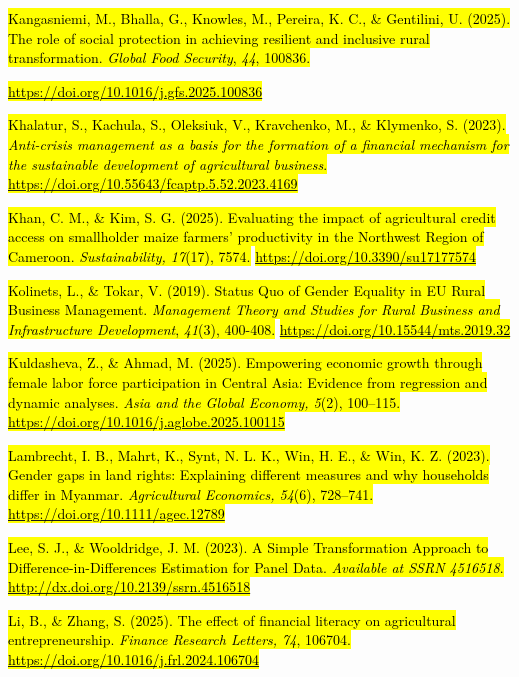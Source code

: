 \documentclass[
]{article}
\begin{document}
\hl{Kangasniemi, M., Bhalla, G., Knowles, M., Pereira, K. C., \&
Gentilini, U. (2025). The role of social protection in achieving
resilient and inclusive rural transformation. \emph{Global Food
Security}, \emph{44}, 100836.}

\href{https://doi.org/10.1016/j.gfs.2025.100836}{\hl{https://doi.org/10.1016/j.gfs.2025.100836}}

\hl{Khalatur, S., Kachula, S., Oleksiuk, V., Kravchenko, M., \&
Klymenko, S. (2023). \emph{Anti-crisis management as a basis for the
formation of a financial mechanism for the sustainable development of
agricultural business}.}
\href{https://doi.org/10.55643/fcaptp.5.52.2023.4169}{\hl{https://doi.org/10.55643/fcaptp.5.52.2023.4169}}

\hl{Khan, C. M., \& Kim, S. G. (2025). Evaluating the impact of
agricultural credit access on smallholder maize farmers' productivity in
the Northwest Region of Cameroon. \emph{Sustainability, 17}(17), 7574.}
\href{https://doi.org/10.3390/su17177574}{\hl{https://doi.org/10.3390/su17177574}}

\hl{Kolinets, L., \& Tokar, V. (2019). Status Quo of Gender Equality in
EU Rural Business Management. \emph{Management Theory and Studies for
Rural Business and Infrastructure Development}, \emph{41}(3), 400-408.}
\href{https://doi.org/10.15544/mts.2019.32}{\hl{https://doi.org/10.15544/mts.2019.32}}

\hl{Kuldasheva, Z., \& Ahmad, M. (2025). Empowering economic growth
through female labor force participation in Central Asia: Evidence from
regression and dynamic analyses. \emph{Asia and the Global Economy,
5}(2), 100--115.}
\href{https://doi.org/10.1016/j.aglobe.2025.100115}{\hl{https://doi.org/10.1016/j.aglobe.2025.100115}}

\hl{Lambrecht, I. B., Mahrt, K., Synt, N. L. K., Win, H. E., \& Win, K.
Z. (2023). Gender gaps in land rights: Explaining different measures and
why households differ in Myanmar. \emph{Agricultural Economics, 54}(6),
728--741.}
\href{https://doi.org/10.1111\%2Fagec.12789}{\hl{https://doi.org/10.1111/agec.12789}}

\hl{Lee, S. J., \& Wooldridge, J. M. (2023). A Simple Transformation
Approach to Difference-in-Differences Estimation for Panel Data.
\emph{Available at SSRN 4516518}.}
\href{http://dx.doi.org/10.2139/ssrn.4516518.}{\hl{http://dx.doi.org/10.2139/ssrn.4516518}}

\hl{Li, B., \& Zhang, S. (2025). The effect of financial literacy on
agricultural entrepreneurship. \emph{Finance Research Letters, 74},
106704.}
\href{https://doi.org/10.1016/j.frl.2024.106704}{\hl{https://doi.org/10.1016/j.frl.2024.106704}}
\end{document}
